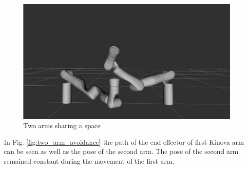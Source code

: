 \documentclass[a4paper, 10pt, conference]{ieeeconf}      %
\begin{document}
\begin{figure}[H]
	\centering
	\includegraphics[scale=0.15]{images/two_arms.jpeg}
	\caption{Two arms sharing a space}
	\label{fig:two_arms}
\end{figure}

In Fig. \ref{fig:two_arm_avoidance} the path of the end effector of first Kinova arm can be seen as well as the pose of the second arm. The pose of the second arm remained constant during the movement of the first arm. 
\end{document}
